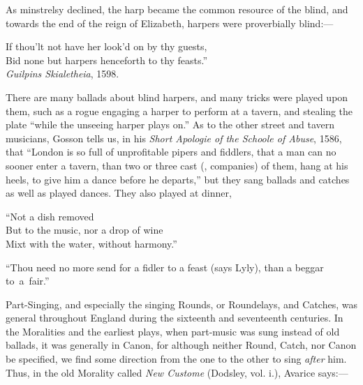 As minstrelsy declined, the harp became the common resource of the blind,
and towards the end of the reign of Elizabeth, harpers were proverbially blind:—
\begin{scverse}If thou’lt not have her look’d on by thy guests,\\
Bid none but harpers henceforth to thy feasts.”\\
\vin\vin\vin\vin\vin\vin\vin\vin\textit{Guilpins Skialetheia}, 1598.
\end{scverse}

There are many ballads about blind harpers, and many tricks were played upon
them, such as a rogue engaging a harper to perform at a tavern, and stealing the
plate “while the unseeing harper plays on.” As to the other street and tavern
musicians, Gosson tells us, in his \textit{Short Apologie of the Schoole of Abuse}, 1586,
that “London is so full of unprofitable pipers and fiddlers, that a man can no
sooner enter a tavern, than two or three cast (\ie, companies) of them, hang at
his heels, to give him a dance before he departs,” but they sang ballads and
catches as well as played dances. They also played at dinner,
\begin{scverse}\vin\vin\vin “Not a dish removed\\
But to the music, nor a drop of wine\\
Mixt with the water, without harmony.”
\end{scverse}

“Thou need no more send for a fidler to a feast (says Lyly), than a beggar to~a~fair.”

Part-Singing, and especially the singing Rounds, or Roundelays, and Catches,
was general throughout England during the sixteenth and seventeenth centuries.
In the Moralities and the earliest plays, when part-music was sung instead of old
ballads, it was generally in Canon, for although neither Round, Catch, nor Canon
be specified, we find some direction from the one to the other to sing \textit{after} him.
Thus, in the old Morality called \textit{New Custome} (Dodsley, vol. i.), Avarice says:—

